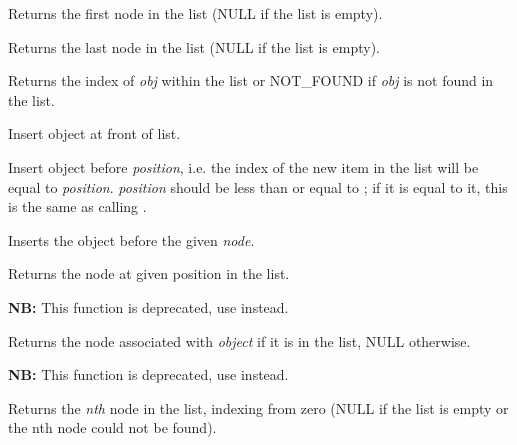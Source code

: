 Returns the first node in the list (NULL if the list is empty).

\label{wxlistgetlast}


Returns the last node in the list (NULL if the list is empty).

\label{wxlistindexof}


Returns the index of {\it obj} within the list or NOT\_FOUND if {\it obj} 
is not found in the list.

\label{wxlistinsert}


Insert object at front of list.


Insert object before {\it position}, i.e. the index of the new item in the
list will be equal to {\it position}. {\it position} should be less than or
equal to ; if it is equal to it, this is the
same as calling .


Inserts the object before the given {\it node}.

\label{wxlistitem}


Returns the node at given position in the list.

\label{wxlistmember}


{\bf NB:} This function is deprecated, use  instead.

Returns the node associated with {\it object} if it is in the list, NULL otherwise.

\label{wxlistnth}


{\bf NB:} This function is deprecated, use  instead.

Returns the {\it nth} node in the list, indexing from zero (NULL if the list is empty
or the nth node could not be found).

